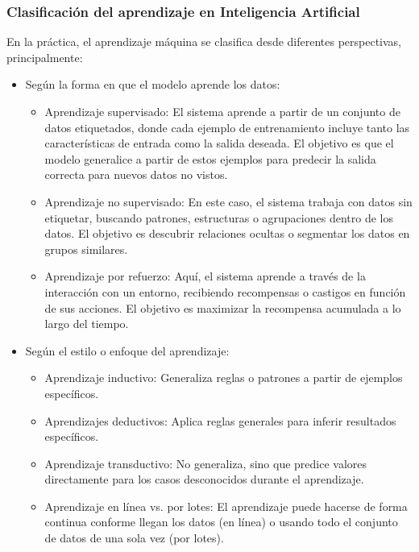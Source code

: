 \documentclass[12pt]{article}
\begin{document}
\subsubsection{Clasificación del aprendizaje en Inteligencia Artificial}
En la práctica, el aprendizaje máquina se clasifica desde diferentes perspectivas, principalmente:
\begin{itemize}
    \item Según la forma en que el modelo aprende los datos: \begin{itemize}
                \item Aprendizaje supervisado: El sistema aprende a partir de un conjunto de datos etiquetados, donde cada ejemplo de entrenamiento incluye tanto las características de entrada como la salida deseada. El objetivo es que el modelo generalice a partir de estos ejemplos para predecir la salida correcta para nuevos datos no vistos.
                \item Aprendizaje no supervisado: En este caso, el sistema trabaja con datos sin etiquetar, buscando patrones, estructuras o agrupaciones dentro de los datos. El objetivo es descubrir relaciones ocultas o segmentar los datos en grupos similares.
                \item Aprendizaje por refuerzo: Aquí, el sistema aprende a través de la interacción con un entorno, recibiendo recompensas o castigos en función de sus acciones. El objetivo es maximizar la recompensa acumulada a lo largo del tiempo.
            \end{itemize}
    \item Según el estilo o enfoque del aprendizaje: \begin{itemize}
                    \item Aprendizaje inductivo: Generaliza reglas o patrones a partir de ejemplos específicos.
                    \item Aprendizajes deductivos: Aplica reglas generales para inferir resultados específicos.
                    \item Aprendizaje transductivo: No generaliza, sino que predice valores directamente para los casos desconocidos durante el aprendizaje.
                    \item Aprendizaje en línea vs. por lotes: El aprendizaje puede hacerse de forma continua conforme llegan los datos (en línea) o usando todo el conjunto de datos de una sola vez (por lotes).
                \end{itemize}
\end{itemize}
\end{document}

